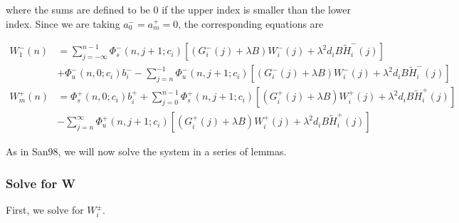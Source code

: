 \documentclass[12pt]{article}
\begin{document}
where the sums are defined to be $0$ if the upper index is smaller than the lower index. Since we are taking $a_0^- = a_m^+ = 0$, the corresponding equations are

\begin{align*}
W_1^-(n) &= \sum_{j = -\infty}^{n-1} \Phi_s^-(n, j+1; c_i)
[(G_i^-(j) + \lambda B) W_i^-(j) + \lambda^2 d_i B \tilde{H}_i^-(j)]
 \\
&+ \Phi_u^-(n, 0; c_i) b_i^- - \sum_{j = n}^{-1} \Phi_u^-(n, j+1; c_i) 
[(G_i^-(j) + \lambda B) W_i^-(j) + \lambda^2 d_i B \tilde{H}_i^-(j)] \\
W_m^+(n) &= \Phi_s^+(n, 0; c_i) b_i^+ + \sum_{j = 0}^{n-1} \Phi_s^+(n, j+1; c_i) 
[(G_i^+(j) + \lambda B) W_i^+(j) + \lambda^2 d_i B \tilde{H}_i^+(j)] \\
&- \sum_{j = n}^{\infty} \Phi_u^+(n, j+1; c_i) 
[(G_i^+(j) + \lambda B) W_i^+(j) + \lambda^2 d_i B \tilde{H}_i^+(j)]
\end{align*}

As in San98, we will now solve the system in a series of lemmas.

\subsubsection{Solve for W}

First, we solve for $W_i^\pm$. 

\end{document}
